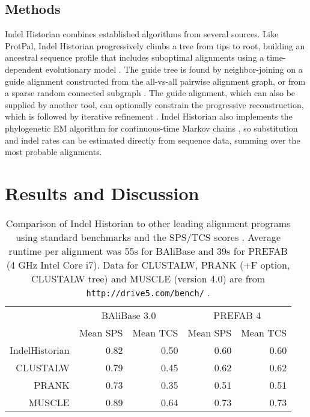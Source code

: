 \documentclass{bioinfo}
\begin{document}
\begin{methods}
\section{Methods}

Indel Historian combines established algorithms from several sources.
Like ProtPal, Indel Historian progressively climbs a tree from tips to root,
building an ancestral sequence profile that includes suboptimal alignments \citep{LeeGrassoSharlow2002,Westesson2012-zg}
using a time-dependent evolutionary model \citep{RivasEddy2015}.
The guide tree is found by neighbor-joining %
on a guide alignment constructed from the all-vs-all pairwise alignment graph,
or from a sparse random connected subgraph \citep{BradleyEtAl2009}.
The guide alignment, which can also be supplied by another tool,
can optionally constrain the progressive reconstruction,
which is followed by iterative refinement \citep{HolmesBruno2001,Edgar2004b}.
Indel Historian also implements the phylogenetic EM algorithm for continuous-time Markov chains \citep{HolmesRubin2002},
so substitution and indel rates can be estimated directly from sequence data,
summing over the most probable alignments.

\end{methods}

\section{Results and Discussion}

\begin{table}
  \begin{tabular}{r|rr|rr}
    & \multicolumn{2}{c|}{BAliBase 3.0} & \multicolumn{2}{c}{PREFAB 4} \\
    & Mean SPS & Mean TCS & Mean SPS & Mean TCS \\
    \hline
IndelHistorian & 0.82 & 0.50 & 0.60 & 0.60 \\
CLUSTALW & 0.79 & 0.45 & 0.62 & 0.62 \\
PRANK & 0.73 & 0.35 & 0.51 & 0.51 \\
MUSCLE & 0.89 & 0.64 & 0.73 & 0.73 \\
  \end{tabular}
  \caption{
    Comparison of Indel Historian to other leading alignment programs using standard benchmarks
    and the SPS/TCS scores \citep{ThompsonEtAl2005}.
    Average runtime per alignment was 55s for BAliBase and 39s for PREFAB (4 GHz Intel Core i7).
    Data for CLUSTALW, PRANK (+F option, CLUSTALW tree) and MUSCLE (version 4.0) are from {\tt http://drive5.com/bench/} \citep{Edgar2010}.
  }
\end{table}
\end{document}
